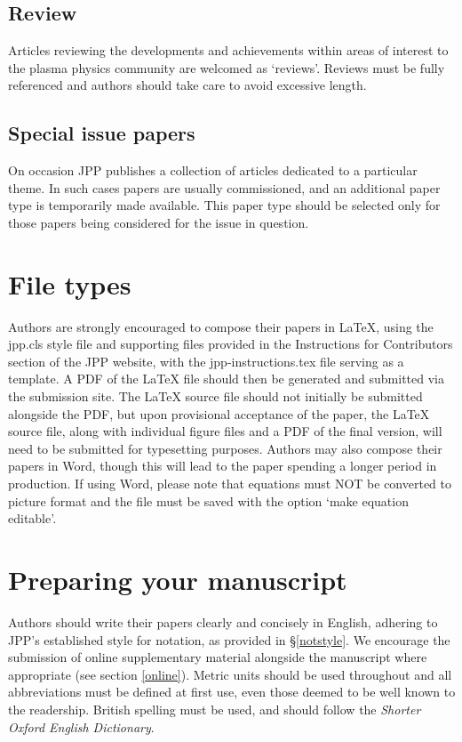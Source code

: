 \documentclass{jpp}
\begin{document}
\subsection{Review}
Articles reviewing the developments and achievements within areas of interest to the plasma physics community are welcomed as `reviews'. Reviews must be fully referenced and authors should take care to avoid excessive length.

\subsection{Special issue papers}
On occasion JPP publishes a collection of articles dedicated to a particular theme. In such cases papers are usually commissioned, and an additional paper type is temporarily made available. This paper type should be selected only for those papers being considered for the issue in question. 

\section{File types}\label{sec:filetypes}
Authors are strongly encouraged to compose their papers in {\LaTeX}, using the jpp.cls style file and supporting files provided in the Instructions for Contributors section of the JPP website, with the jpp-instructions.tex file serving as a template. A PDF of the {\LaTeX} file should then be generated and submitted via the submission site. The {\LaTeX} source file should not initially be submitted alongside the PDF, but upon provisional acceptance of the paper, the {\LaTeX} source file, along with individual figure files and a PDF of the final version, will need to be submitted for typesetting purposes. 
Authors may also compose their papers in Word, though this will lead to the paper spending a longer period in production. If using Word, please note that equations must NOT be converted to picture format and the file must be saved with the option `make equation editable'. 

\section{Preparing your manuscript}
Authors should write their papers clearly and concisely in English, adhering to JPP's established style for notation, as provided in \S\ref{notstyle}. We encourage the submission of online supplementary material alongside the manuscript where appropriate (see section \ref{online}). Metric units should be used throughout and all abbreviations must be defined at first use, even those deemed to be well known to the readership. British spelling must be used, and should follow the \textit{Shorter Oxford English Dictionary}.
\end{document}

